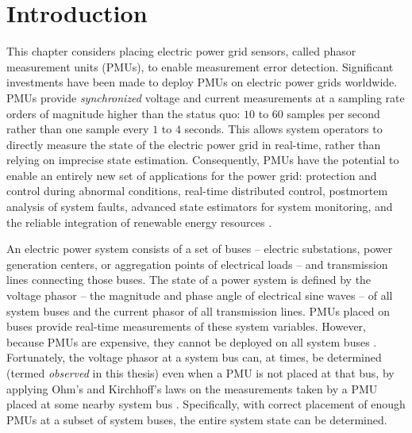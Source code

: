 \section{Introduction}
\label{sec:intro-pmu}

%	
%
               


This chapter considers placing electric power grid sensors, called phasor measurement units (PMUs), to enable measurement error detection.
Significant investments have been made to deploy PMUs on electric power grids worldwide. PMUs provide \emph{synchronized} voltage and current measurements at a sampling rate orders 
of magnitude higher than the status quo: $10$ to $60$ samples per second rather than one sample every $1$ to $4$ seconds.  This allows system operators to directly measure the state of the electric power grid in real-time, rather than 
relying on imprecise state estimation. Consequently, PMUs have the potential to enable
an entirely new set of applications for the power grid:  protection and control during abnormal conditions, real-time distributed control, postmortem analysis of system faults,
advanced state estimators for system monitoring, and the reliable integration of renewable energy resources \cite{Naspi10}.

An electric power system consists of a set of buses  -- electric substations, power generation centers, or aggregation points of electrical loads -- and transmission lines connecting those buses.
The state of a power system is defined by the voltage phasor -- the magnitude and phase angle of electrical sine waves -- of all system buses and the current phasor of all transmission lines.
PMUs placed on buses provide real-time measurements of these system variables.
However, because PMUs are expensive, they cannot be deployed on all system buses \cite{Baldwin93}\cite{LaRee10}. Fortunately, the voltage phasor at a system bus can, at times, 
be determined (termed {\it observed} in this thesis) even when a PMU is not placed at that bus, by applying Ohm's and Kirchhoff's laws
on the measurements taken by a PMU placed at some nearby system bus \cite{Baldwin93}\cite{Brueni05}. Specifically, with correct placement of enough PMUs at a subset of system buses, the entire system state can be determined. 

